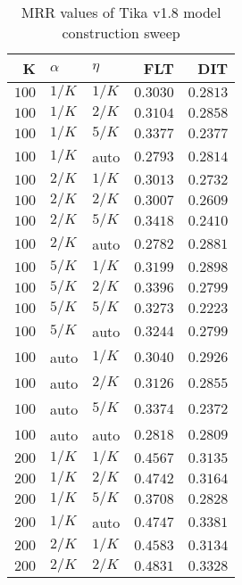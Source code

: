 
\begin{table}
\begin{spacing}{1.2}
\centering
\caption{MRR values of Tika v1.8 model construction sweep}
\label{table:tika_model_sweep}
\vspace{0.2em}
\parbox{.45\linewidth}{\centering \begin{tabular}{rll|rr}
\toprule
    K &  $\alpha$ &    $\eta$ & FLT &   DIT \\
\midrule
$100$ &  $1/K$ &  $1/K$ &         $0.3030$ & $0.2813$ \\
$100$ &  $1/K$ &  $2/K$ &         $0.3104$ & $0.2858$ \\
$100$ &  $1/K$ &  $5/K$ &         $0.3377$ & $0.2377$ \\
$100$ &  $1/K$ &   auto &         $0.2793$ & $0.2814$ \\
$100$ &  $2/K$ &  $1/K$ &         $0.3013$ & $0.2732$ \\
$100$ &  $2/K$ &  $2/K$ &         $0.3007$ & $0.2609$ \\
$100$ &  $2/K$ &  $5/K$ &         $0.3418$ & $0.2410$ \\
$100$ &  $2/K$ &   auto &         $0.2782$ & $0.2881$ \\
$100$ &  $5/K$ &  $1/K$ &         $0.3199$ & $0.2898$ \\
$100$ &  $5/K$ &  $2/K$ &         $0.3396$ & $0.2799$ \\
$100$ &  $5/K$ &  $5/K$ &         $0.3273$ & $0.2223$ \\
$100$ &  $5/K$ &   auto &         $0.3244$ & $0.2799$ \\
$100$ &   auto &  $1/K$ &         $0.3040$ & $0.2926$ \\
$100$ &   auto &  $2/K$ &         $0.3126$ & $0.2855$ \\
$100$ &   auto &  $5/K$ &         $0.3374$ & $0.2372$ \\
$100$ &   auto &   auto &         $0.2818$ & $0.2809$ \\
$200$ &  $1/K$ &  $1/K$ &         $0.4567$ & $0.3135$ \\
$200$ &  $1/K$ &  $2/K$ &         $0.4742$ & $0.3164$ \\
$200$ &  $1/K$ &  $5/K$ &         $0.3708$ & $0.2828$ \\
$200$ &  $1/K$ &   auto &         $0.4747$ & $0.3381$ \\
$200$ &  $2/K$ &  $1/K$ &         $0.4583$ & $0.3134$ \\
$200$ &  $2/K$ &  $2/K$ &    $\bm{0.4831}$ & $0.3328$ \\

\end{tabular}}
\end{spacing}
\end{table}
